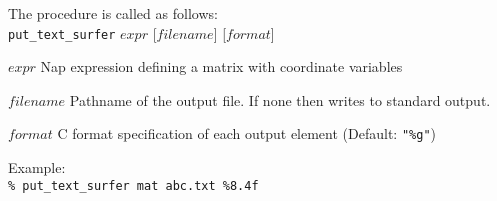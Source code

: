 The procedure is called as follows: \\
  \texttt{put\_text\_surfer} $\mathit{expr}$ [$\mathit{filename}$] [$\mathit{format}$]
  \begin{simpleitems}
    \item $\mathit{expr}$
    Nap expression defining a matrix with coordinate variables
    \item $\mathit{filename}$
    Pathname of the output file. If none then writes to standard output.
    \item $\mathit{format}$
    C format specification of each output element (Default: \texttt{"\%g"})
  \end{simpleitems}

Example: \\
  \texttt{\% put\_text\_surfer mat abc.txt \%8.4f}
